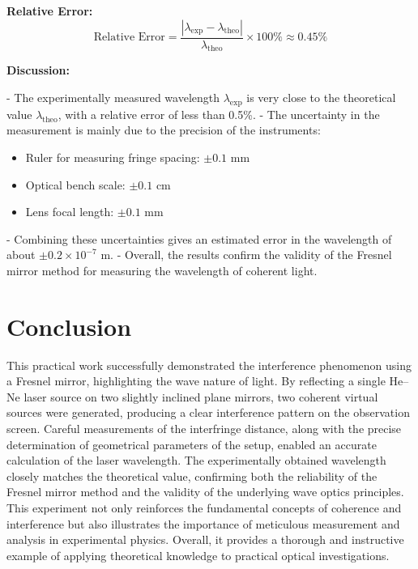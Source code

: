 \documentclass[12pt,a4paper,twoside]{article}
\begin{document}
\textbf{Relative Error:}
\[
\text{Relative Error} = \frac{|\lambda_\text{exp} - \lambda_\text{theo}|}{\lambda_\text{theo}} \times 100\% \approx 0.45\%
\]

\bigskip

\textbf{Discussion:}  

- The experimentally measured wavelength $\lambda_\text{exp}$ is very close to the theoretical value $\lambda_\text{theo}$, with a relative error of less than 0.5\%.  
- The uncertainty in the measurement is mainly due to the precision of the instruments:
    \begin{itemize}
        \item Ruler for measuring fringe spacing: $\pm 0.1$ mm
        \item Optical bench scale: $\pm 0.1$ cm
        \item Lens focal length: $\pm 0.1$ mm
    \end{itemize}
- Combining these uncertainties gives an estimated error in the wavelength of about $\pm 0.2 \times 10^{-7}$ m.
- Overall, the results confirm the validity of the Fresnel mirror method for measuring the wavelength of coherent light.

\section{Conclusion}
This practical work successfully demonstrated the interference phenomenon using a Fresnel mirror, highlighting the wave nature of light. 
By reflecting a single He--Ne laser source on two slightly inclined plane mirrors, two coherent virtual sources were generated, producing a clear interference pattern on the observation screen. 
Careful measurements of the interfringe distance, along with the precise determination of geometrical parameters of the setup, enabled an accurate calculation of the laser wavelength. 
The experimentally obtained wavelength closely matches the theoretical value, confirming both the reliability of the Fresnel mirror method and the validity of the underlying wave optics principles. 
This experiment not only reinforces the fundamental concepts of coherence and interference but also illustrates the importance of meticulous measurement and analysis in experimental physics. 
Overall, it provides a thorough and instructive example of applying theoretical knowledge to practical optical investigations.
\end{document}
